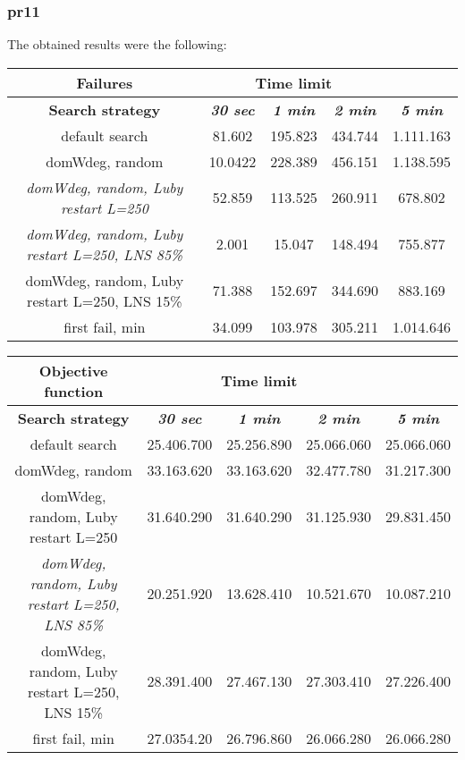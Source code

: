 \subsubsection{pr11}
The obtained results were the following:
{
\renewcommand{\arraystretch}{2}
\begin{longtable}[h]{| c | c | c | c | c |}
    \hline
    \textbf{Failures} & \multicolumn{3}{c}{Time limit} & \\
    \hline
    \textbf{Search strategy} & \textbf{\textit{30 sec}} & \textbf{\textit{1 min}} & \textbf{\textit{2 min}} & \textbf{\textit{5 min}} \\
    \hline
    \endhead
    default search                                         &  81.602 & 195.823 & 434.744 & 1.111.163 \\
    \hline
    domWdeg, random                                        & 10.0422 & 228.389 & 456.151 & 1.138.595 \\
    \hline
    \textit{domWdeg, random, Luby restart L=250}           &  52.859 & 113.525 & 260.911 &  678.802 \\
    \hline
    \textit{domWdeg, random, Luby restart L=250, LNS 85\%} &   2.001 &  15.047 & 148.494 &  755.877 \\
    \hline
    domWdeg, random, Luby restart L=250, LNS 15\%          &  71.388 & 152.697 & 344.690 &  883.169 \\
    \hline
    first fail, min                                        &  34.099 & 103.978 & 305.211 & 1.014.646 \\
    \hline
\end{longtable}
}

{
\renewcommand{\arraystretch}{2}
\begin{longtable}[h]{| c | c | c | c | c |}
    \hline
    \textbf{Objective function} & \multicolumn{3}{c}{Time limit} & \\
    \hline
    \textbf{Search strategy} & \textbf{\textit{30 sec}} & \textbf{\textit{1 min}} & \textbf{\textit{2 min}} & \textbf{\textit{5 min}} \\
    \hline
    \endhead
    default search                                         & 25.406.700 & 25.256.890 & 25.066.060 & 25.066.060 \\
    \hline
    domWdeg, random                                        & 33.163.620 & 33.163.620 & 32.477.780 & 31.217.300 \\
    \hline
    domWdeg, random, Luby restart L=250                    & 31.640.290 & 31.640.290 & 31.125.930 & 29.831.450 \\
    \hline
    \textit{domWdeg, random, Luby restart L=250, LNS 85\%} & 20.251.920 & 13.628.410 & 10.521.670 & 10.087.210 \\
    \hline
    domWdeg, random, Luby restart L=250, LNS 15\%          & 28.391.400 & 27.467.130 & 27.303.410 & 27.226.400 \\
    \hline
    first fail, min                                        & 27.0354.20 & 26.796.860 & 26.066.280 & 26.066.280 \\
    \hline
\end{longtable}
}

